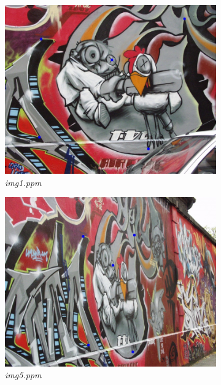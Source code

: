 \documentclass[11pt, a4paper]{article}
\begin{document}
\begin{figure}[H]
	\centering
	\begin{subfigure}[b]{0.32\textwidth}
		\centering
		\includegraphics[width=\textwidth]{./images/Q3im1.jpg}
		\caption{{\small \textit{img1.ppm}}}
		\label{fig:3im1}
	\end{subfigure}
	\hfill
	\begin{subfigure}[b]{0.32\textwidth}
		\centering
		\includegraphics[width=\textwidth]{./images/Q3im5.jpg}
		\caption{{\small \textit{img5.ppm}}}
		\label{fig:3im5}
	\end{subfigure}
	\hfill
	\begin{subfigure}[b]{0.32\textwidth}

\end{subfigure}
\end{figure}
\end{document}
